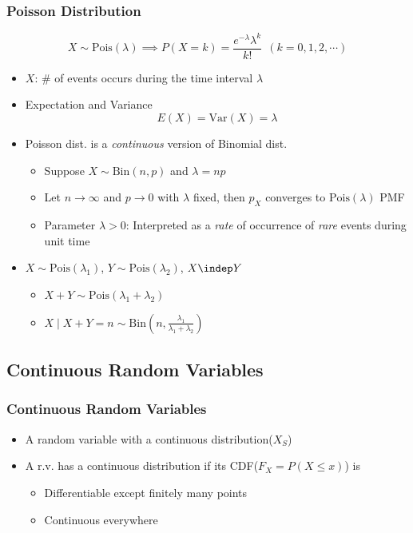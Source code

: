 \subsubsection*{Poisson Distribution}
\begin{equation}
    X\sim\text{Pois}(\lambda)\implies P(X=k)=\frac{e^{-\lambda}\lambda^k}{k!}~~(k=0,1,2,\cdots)
\end{equation}
\begin{itemize}
    \item $X$: \# of events occurs during the time interval $\lambda$
    \item Expectation and Variance
    \begin{equation}
        E(X)=\text{Var}(X)=\lambda
    \end{equation}
    \item Poisson dist. is a \textit{continuous} version of Binomial dist.
    \begin{itemize}
        \item Suppose $X\sim\text{Bin}(n,p)$ and $\lambda=np$
        \item Let $n\to\infty$ and $p\to 0$ with $\lambda$ fixed, then $p_X$ converges to $\text{Pois}(\lambda)$ PMF
        \item Parameter $\lambda>0$: Interpreted as a \textit{rate} of occurrence of \textit{rare} events during unit time
    \end{itemize}
    \item $X\sim\text{Pois}(\lambda_1)$, $Y\sim\text{Pois}(\lambda_2)$, $X\indep Y$
    \begin{itemize}
        \item $X+Y\sim\text{Pois}(\lambda_1+\lambda_2)$
        \item $X\mid X+Y=n\sim\text{Bin}\left(n,\frac{\lambda_1}{\lambda_1+\lambda_2}\right)$
    \end{itemize}
\end{itemize}

\subsection{Continuous Random Variables}

\subsubsection*{Continuous Random Variables}
\begin{itemize}
    \item A random variable with a continuous distribution($X_S$)
    \item A r.v. has a continuous distribution if its CDF($F_X=P(X\leq x)$) is
    \begin{itemize}
        \item Differentiable except finitely many points
        \item Continuous everywhere
    \end{itemize}
\end{itemize}

